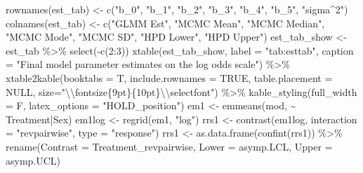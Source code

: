 \documentclass[12pt]{article}
\newenvironment{Shaded}{\begin{snugshade}}{\end{snugshade}}
\newcommand{\AttributeTok}[1]{\textcolor[rgb]{0.77,0.63,0.00}{#1}}
\newcommand{\ConstantTok}[1]{\textcolor[rgb]{0.00,0.00,0.00}{#1}}
\newcommand{\DecValTok}[1]{\textcolor[rgb]{0.00,0.00,0.81}{#1}}
\newcommand{\FunctionTok}[1]{\textcolor[rgb]{0.00,0.00,0.00}{#1}}
\newcommand{\NormalTok}[1]{#1}
\newcommand{\OtherTok}[1]{\textcolor[rgb]{0.56,0.35,0.01}{#1}}
\newcommand{\SpecialCharTok}[1]{\textcolor[rgb]{0.00,0.00,0.00}{#1}}
\newcommand{\StringTok}[1]{\textcolor[rgb]{0.31,0.60,0.02}{#1}}
\begin{document}
\begin{Shaded}
\begin{Highlighting}[]
\FunctionTok{rownames}\NormalTok{(est\_tab) }\OtherTok{\textless{}{-}} \FunctionTok{c}\NormalTok{(}\StringTok{"b\_0"}\NormalTok{, }\StringTok{"b\_1"}\NormalTok{, }\StringTok{"b\_2"}\NormalTok{, }\StringTok{"b\_3"}\NormalTok{, }
                       \StringTok{"b\_4"}\NormalTok{, }\StringTok{"b\_5"}\NormalTok{, }\StringTok{"sigma\^{}2"}\NormalTok{)}
\FunctionTok{colnames}\NormalTok{(est\_tab) }\OtherTok{\textless{}{-}} \FunctionTok{c}\NormalTok{(}\StringTok{"GLMM Est"}\NormalTok{, }\StringTok{"MCMC Mean"}\NormalTok{, }\StringTok{"MCMC Median"}\NormalTok{, }
                       \StringTok{"MCMC Mode"}\NormalTok{, }\StringTok{"MCMC SD"}\NormalTok{, }\StringTok{"HPD Lower"}\NormalTok{, }\StringTok{"HPD Upper"}\NormalTok{)}
\NormalTok{est\_tab\_show }\OtherTok{\textless{}{-}}\NormalTok{ est\_tab }\SpecialCharTok{\%\textgreater{}\%} \FunctionTok{select}\NormalTok{(}\SpecialCharTok{{-}}\FunctionTok{c}\NormalTok{(}\DecValTok{2}\SpecialCharTok{:}\DecValTok{3}\NormalTok{))}
\FunctionTok{xtable}\NormalTok{(est\_tab\_show, }\AttributeTok{label =} \StringTok{"tab:esttab"}\NormalTok{, }
       \AttributeTok{caption =} \StringTok{"Final model parameter estimates on the log odds scale"}\NormalTok{) }\SpecialCharTok{\%\textgreater{}\%}
  \FunctionTok{xtable2kable}\NormalTok{(}\AttributeTok{booktabs =}\NormalTok{ T, }\AttributeTok{include.rownames =} \ConstantTok{TRUE}\NormalTok{,}
               \AttributeTok{table.placement =} \ConstantTok{NULL}\NormalTok{, }\AttributeTok{size=}\StringTok{"}\SpecialCharTok{\textbackslash{}\textbackslash{}}\StringTok{fontsize\{9pt\}\{10pt\}}\SpecialCharTok{\textbackslash{}\textbackslash{}}\StringTok{selectfont"}\NormalTok{) }\SpecialCharTok{\%\textgreater{}\%}
  \FunctionTok{kable\_styling}\NormalTok{(}\AttributeTok{full\_width =}\NormalTok{ F, }\AttributeTok{latex\_options =} \StringTok{"HOLD\_position"}\NormalTok{) }
\NormalTok{em1 }\OtherTok{\textless{}{-}} \FunctionTok{emmeans}\NormalTok{(mod, }\SpecialCharTok{\textasciitilde{}}\NormalTok{ Treatment}\SpecialCharTok{|}\NormalTok{Sex)}
\NormalTok{em1log }\OtherTok{\textless{}{-}} \FunctionTok{regrid}\NormalTok{(em1, }\StringTok{"log"}\NormalTok{)}
\NormalTok{rrs1 }\OtherTok{\textless{}{-}} \FunctionTok{contrast}\NormalTok{(em1log, }\AttributeTok{interaction =} \StringTok{"revpairwise"}\NormalTok{, }\AttributeTok{type =} \StringTok{"response"}\NormalTok{)}
\NormalTok{rrs1 }\OtherTok{\textless{}{-}} \FunctionTok{as.data.frame}\NormalTok{(}\FunctionTok{confint}\NormalTok{(rrs1)) }\SpecialCharTok{\%\textgreater{}\%}
  \FunctionTok{rename}\NormalTok{(}\AttributeTok{Contrast =}\NormalTok{ Treatment\_revpairwise, }\AttributeTok{Lower =}\NormalTok{ asymp.LCL, }\AttributeTok{Upper =}\NormalTok{ asymp.UCL)}


\end{Highlighting}
\end{Shaded}
\end{document}
